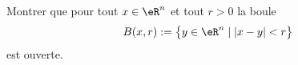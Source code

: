 
\begin{exercice}\label{exo0083}

Montrer que pour tout $x \in \eR^n$ et tout $r >0$ la boule 
\[ 
	B(x,r):=\big\{ y \in \eR^n \mid \left|x-y \right| < r \big\}
\]
est ouverte.

\end{exercice}
